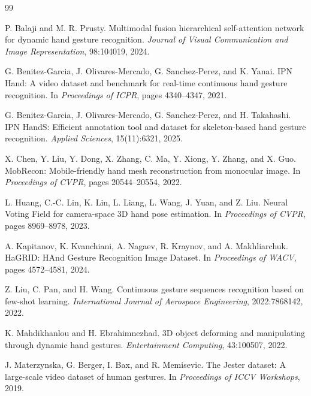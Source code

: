 \documentclass{article}
\begin{document}
\begin{thebibliography}{99}
\small

P. Balaji and M. R. Prusty.
\newblock Multimodal fusion hierarchical self-attention network for dynamic hand gesture recognition.
\newblock \emph{Journal of Visual Communication and Image Representation}, 98:104019, 2024.

G. Benitez-Garcia, J. Olivares-Mercado, G. Sanchez-Perez, and K. Yanai.
\newblock IPN Hand: A video dataset and benchmark for real-time continuous hand gesture recognition.
\newblock In \emph{Proceedings of ICPR}, pages 4340--4347, 2021.

G. Benitez-Garcia, J. Olivares-Mercado, G. Sanchez-Perez, and H. Takahashi.
\newblock IPN HandS: Efficient annotation tool and dataset for skeleton-based hand gesture recognition.
\newblock \emph{Applied Sciences}, 15(11):6321, 2025.

X. Chen, Y. Liu, Y. Dong, X. Zhang, C. Ma, Y. Xiong, Y. Zhang, and X. Guo.
\newblock MobRecon: Mobile-friendly hand mesh reconstruction from monocular image.
\newblock In \emph{Proceedings of CVPR}, pages 20544--20554, 2022.

L. Huang, C.-C. Lin, K. Lin, L. Liang, L. Wang, J. Yuan, and Z. Liu.
\newblock Neural Voting Field for camera-space 3D hand pose estimation.
\newblock In \emph{Proceedings of CVPR}, pages 8969--8978, 2023.

A. Kapitanov, K. Kvanchiani, A. Nagaev, R. Kraynov, and A. Makhliarchuk.
\newblock HaGRID: HAnd Gesture Recognition Image Dataset.
\newblock In \emph{Proceedings of WACV}, pages 4572--4581, 2024.

Z. Liu, C. Pan, and H. Wang.
\newblock Continuous gesture sequences recognition based on few-shot learning.
\newblock \emph{International Journal of Aerospace Engineering}, 2022:7868142, 2022.

K. Mahdikhanlou and H. Ebrahimnezhad.
\newblock 3D object deforming and manipulating through dynamic hand gestures.
\newblock \emph{Entertainment Computing}, 43:100507, 2022.

J. Materzynska, G. Berger, I. Bax, and R. Memisevic.
\newblock The Jester dataset: A large-scale video dataset of human gestures.
\newblock In \emph{Proceedings of ICCV Workshops}, 2019.


\end{thebibliography}
\end{document}
